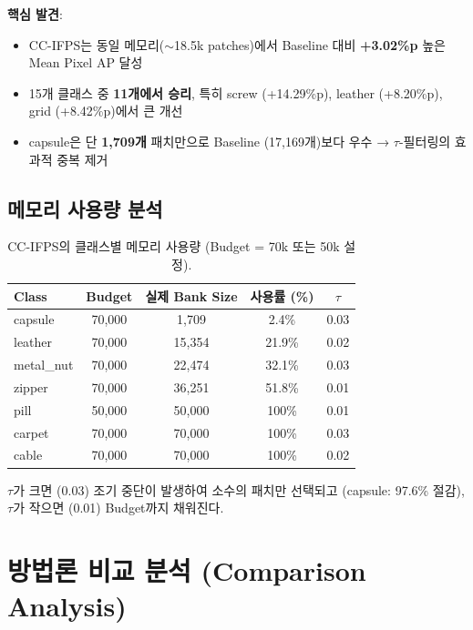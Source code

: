 \documentclass[11pt,a4paper]{article}
\begin{document}
\textbf{핵심 발견}:
\begin{itemize}
  \item CC-IFPS는 동일 메모리($\sim$18.5k patches)에서 Baseline 대비 \textbf{+3.02\%p} 높은 Mean Pixel AP 달성
  \item 15개 클래스 중 \textbf{11개에서 승리}, 특히 screw (+14.29\%p), leather (+8.20\%p), grid (+8.42\%p)에서 큰 개선
  \item capsule은 단 \textbf{1,709개} 패치만으로 Baseline (17,169개)보다 우수 → $\tau$-필터링의 효과적 중복 제거
\end{itemize}

\subsection{메모리 사용량 분석}

\begin{table}[H]
\centering
\caption{CC-IFPS의 클래스별 메모리 사용량 (Budget = 70k 또는 50k 설정).}
\label{tab:memory_usage}
\small
\begin{tabular}{l c c c c}
\toprule
\textbf{Class} & \textbf{Budget} & \textbf{실제 Bank Size} & \textbf{사용률 (\%)} & $\tau$ \\
\midrule
capsule      & 70,000 & 1,709 & 2.4\% & 0.03 \\
leather      & 70,000 & 15,354 & 21.9\% & 0.02 \\
metal\_nut   & 70,000 & 22,474 & 32.1\% & 0.03 \\
zipper       & 70,000 & 36,251 & 51.8\% & 0.01 \\
pill         & 50,000 & 50,000 & 100\% & 0.01 \\
carpet       & 70,000 & 70,000 & 100\% & 0.03 \\
cable        & 70,000 & 70,000 & 100\% & 0.02 \\
\bottomrule
\end{tabular}
\end{table}

$\tau$가 크면 (0.03) 조기 중단이 발생하여 소수의 패치만 선택되고 (capsule: 97.6\% 절감), $\tau$가 작으면 (0.01) Budget까지 채워진다.


\section{방법론 비교 분석 (Comparison Analysis)}
\end{document}

